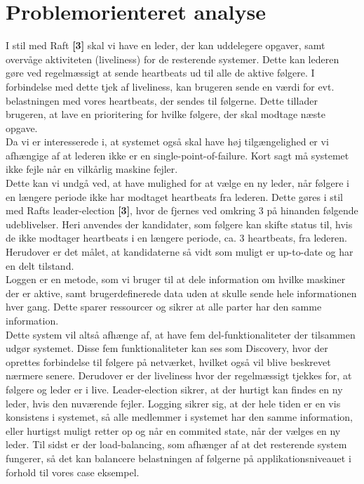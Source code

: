 \documentclass[a4paper,12pt]{article}
\begin{document}
\section{Problemorienteret analyse}
I stil med Raft \textbf{[3]} skal vi have en leder, der kan uddelegere opgaver, samt overvåge aktiviteten (liveliness) for de resterende systemer. Dette kan lederen gøre ved regelmæssigt at sende heartbeats ud til alle de aktive følgere. I forbindelse med dette tjek af liveliness, kan brugeren sende en værdi for evt. belastningen med vores heartbeats, der sendes til følgerne. Dette tillader brugeren, at lave en prioritering for hvilke følgere, der skal modtage næste opgave.
\\
Da vi er interesserede i, at systemet også skal have høj tilgængelighed er vi afhængige af at lederen ikke er en single-point-of-failure. Kort sagt må systemet ikke fejle når en vilkårlig maskine fejler.
\\[5px]
Dette kan vi undgå ved, at have mulighed for at vælge en ny leder, når følgere i en længere periode ikke har modtaget heartbeats fra lederen. Dette gøres i stil med Rafts leader-election \textbf{[3]}, hvor de fjernes ved omkring 3 på hinanden følgende udeblivelser. Heri anvendes der kandidater, som følgere kan skifte status til, hvis de ikke modtager heartbeats i en længere periode, ca. 3 heartbeats, fra lederen. Herudover er det målet, at kandidaterne så vidt som muligt er up-to-date og har en delt tilstand. 
\\
Loggen er en metode, som vi bruger til at dele information om hvilke maskiner der er aktive, samt brugerdefinerede data uden at skulle sende hele informationen hver gang. Dette sparer ressourcer og sikrer at alle parter har den samme information.
\\[5px]
Dette system vil altså afhænge af, at have fem del-funktionaliteter der tilsammen udgør systemet. Disse fem funktionaliteter kan ses som Discovery, hvor der oprettes forbindelse til følgere på netværket, hvilket også vil blive beskrevet nærmere senere. Derudover er der liveliness hvor der regelmæssigt tjekkes for, at følgere og leder er i live. Leader-election sikrer, at der hurtigt kan findes en ny leder, hvis den nuværende fejler. Logging sikrer sig, at der hele tiden er en vis konsistens i systemet, så alle medlemmer i systemet har den samme information, eller hurtigst muligt retter op og når en commited state, når der vælges en ny leder. Til sidst er der load-balancing, som afhænger af at det resterende system fungerer, så det kan balancere belastningen af følgerne på applikationsniveauet i forhold til vores case eksempel.
\end{document}
